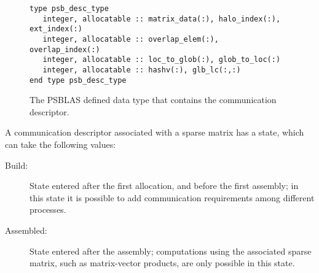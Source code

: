 \begin{figure}[h!]
  \begin{Sbox}
    \begin{minipage}[tl]{0.9\textwidth}
\begin{verbatim} 
type psb_desc_type 
   integer, allocatable :: matrix_data(:), halo_index(:), ext_index(:)
   integer, allocatable :: overlap_elem(:), overlap_index(:)
   integer, allocatable :: loc_to_glob(:), glob_to_loc(:)
   integer, allocatable :: hashv(:), glb_lc(:,:)
end type psb_desc_type 
\end{verbatim}
    \end{minipage}
  \end{Sbox}
  \setlength{\fboxsep}{8pt}
  \begin{center}
    \fbox{\TheSbox}
  \end{center}
  \caption{\label{fig:desctype}The PSBLAS defined data type that
    contains the communication descriptor.}
\end{figure}

A communication descriptor associated with a sparse  matrix has a
state, which can take the following values:
\begin{description}
\item[Build:] State entered after the first allocation, and before the
  first assembly; in this state it is possible to add communication
  requirements among different processes. 
\item[Assembled:] State entered after the assembly; computations using
  the associated sparse matrix, such as matrix-vector products, are
  only possible   in this state.
\end{description}
